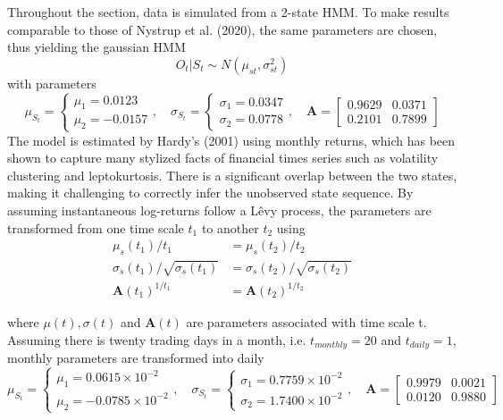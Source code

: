 Throughout the section, data is simulated from a 2-state HMM. To make results comparable to those of Nystrup et al. (2020), the same parameters are chosen, thus yielding the gaussian HMM
\begin{equation*}
    O_t|S_t \sim N(\mu_{st}, \sigma_{st}^2)
\end{equation*}
with parameters
$$
    \mu_{S_t}=
    \begin{cases}
        \mu_1= 0.0123 \\
        \mu_2= -0.0157
    \end{cases}, \quad
    \sigma_{S_t} =
    \begin{cases}
        \sigma_1 = 0.0347 \\
        \sigma_2 = 0.0778
    \end{cases}, \quad
    \mathbf{A} = 
    \begin{bmatrix}
        0.9629 & 0.0371 \\
        0.2101 & 0.7899
    \end{bmatrix}
$$
The model is estimated by Hardy's (2001) using monthly returns, which has been shown to capture many stylized facts of financial times series such as volatility clustering and leptokurtosis. There is a significant overlap between the two states, making it challenging to correctly infer the unobserved state sequence. By assuming instantaneous log-returns follow a Lêvy process, the parameters are transformed from one time scale $t_1$ to another $t_2$ using
\begin{align*}
    \mu_s(t_1) / t_1 &= \mu_s(t_2) / t_2 \\
    \sigma_s(t_1) / \sqrt{\sigma_s(t_1)} &= \sigma_s(t_2) / \sqrt{\sigma_s(t_2)} \\
    \mathbf{A}(t_1)^{1/t_1} &= \mathbf{A}(t_2)^{1/t_2}
\end{align*}

where $\mu(t), \sigma(t)$ and $\mathbf{A}(t)$ are parameters associated with time scale t. Assuming there is twenty trading days in a month, i.e. $t_{monthly}=20$ and $t_{daily}=1$, monthly parameters are transformed into daily
$$
    \mu_{S_t}=
    \begin{cases}
        \mu_1= 0.0615 \times 10^{-2} \\
        \mu_2= -0.0785 \times 10^{-2}
    \end{cases}, \quad
    \sigma_{S_t} =
    \begin{cases}
        \sigma_1 = 0.7759 \times 10^{-2} \\
        \sigma_2 = 1.7400 \times 10^{-2}
    \end{cases}, \quad
    \mathbf{A} = 
    \begin{bmatrix}
        0.9979 & 0.0021 \\
        0.0120 & 0.9880
    \end{bmatrix}
$$

